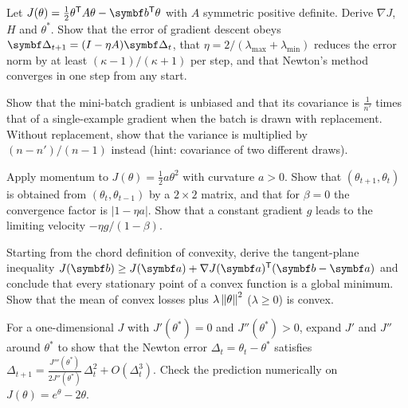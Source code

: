 \documentclass[11pt]{article}
\newcommand{\errv}{\vect{\Delta}}
\begin{document}
\begin{questions}
\begin{derivations}
\item Let $J(\theta) = \frac12\theta\T A\theta - \vect{b}\T\theta$ with $A$ symmetric positive definite. Derive
$\nabla J$, $H$ and $\theta^*$. Show that the error of gradient descent obeys $\errv_{t+1} = (I - \eta A)\errv_t$,
that $\eta = 2/(\lambda_{\max} + \lambda_{\min})$ reduces the error norm by at least $(\kappa - 1)/(\kappa + 1)$ per
step, and that Newton's method converges in one step from any start.
\item Show that the mini-batch gradient is unbiased and that its covariance is $\frac{1}{n'}$ times that of a
single-example gradient when the batch is drawn with replacement. Without replacement, show that the variance is
multiplied by $(n - n')/(n - 1)$ instead (hint: covariance of two different draws).
\item Apply momentum to $J(\theta) = \frac12 a\theta^2$ with curvature $a > 0$. Show that $(\theta_{t+1}, \theta_t)$ is
obtained from $(\theta_t, \theta_{t-1})$ by a $2 \times 2$ matrix, and that for $\beta = 0$ the convergence factor is
$|1 - \eta a|$. Show that a constant gradient $g$ leads to the limiting velocity $-\eta g/(1 - \beta)$.
\item Starting from the chord definition of convexity, derive the tangent-plane inequality
$J(\vect{b}) \ge J(\vect{a}) + \nabla J(\vect{a})\T(\vect{b} - \vect{a})$ and conclude that every stationary point of a
convex function is a global minimum. Show that the mean of convex losses plus $\lambda\left\lVert \theta \right\rVert^2$ ($\lambda \ge 0$)
is convex.
\item For a one-dimensional $J$ with $J'(\theta^*) = 0$ and $J''(\theta^*) > 0$, expand $J'$ and $J''$ around $\theta^*$
to show that the Newton error $\Delta_t = \theta_t - \theta^*$ satisfies
$\Delta_{t+1} = \frac{J'''(\theta^*)}{2J''(\theta^*)}\,\Delta_t^2 + O(\Delta_t^3)$. Check the prediction numerically on
$J(\theta) = e^\theta - 2\theta$.
\end{derivations}


\end{questions}
\end{document}
